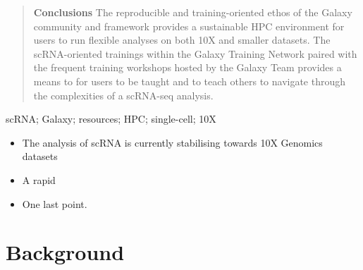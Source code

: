 \documentclass[a4paper,num-refs]{oup-contemporary}
\begin{document}
\begin{frontmatter}
\begin{abstract}
\textbf{Conclusions}
The reproducible and training-oriented ethos of the Galaxy community and framework provides a sustainable HPC environment for users to run flexible analyses on both 10X and smaller datasets. The scRNA-oriented trainings within the Galaxy Training Network paired with the frequent training workshops hosted by the Galaxy Team provides a means to for users to be taught and to teach others to navigate through the complexities of a scRNA-seq analysis.
\end{abstract}

\begin{keywords}
scRNA; Galaxy; resources; HPC; single-cell; 10X
\end{keywords}
\end{frontmatter}

\begin{keypoints*}
\begin{itemize}
\item The analysis of scRNA is currently stabilising towards 10X Genomics datasets
\item A rapid
\item One last point.
\end{itemize}
\end{keypoints*}

\section{Background}
\label{sec:background}
\end{document}
